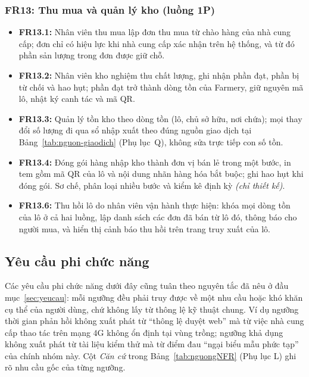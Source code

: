 \subsubsection*{FR13: Thu mua và quản lý kho (luồng 1P)}
\begin{itemize}
    \item \textbf{FR13.1:} Nhân viên thu mua lập đơn thu mua từ chào hàng của
    nhà cung cấp; đơn chỉ có hiệu lực khi nhà cung cấp xác nhận trên hệ thống,
    và từ đó phần sản lượng trong đơn được giữ chỗ.
    \item \textbf{FR13.2:} Nhân viên kho nghiệm thu chất lượng, ghi nhận phần
    đạt, phần bị từ chối và hao hụt; phần đạt trở thành dòng tồn của Farmery,
    giữ nguyên mã lô, nhật ký canh tác và mã QR.
    \item \textbf{FR13.3:} Quản lý tồn kho theo dòng tồn (lô, chủ sở hữu,
    nơi chứa); mọi thay đổi số lượng đi qua sổ nhập xuất theo đúng nguồn giao
    dịch tại Bảng~\ref{tab:nguon-giaodich} (Phụ lục~Q), không sửa trực tiếp con số tồn.
    \item \textbf{FR13.4:} Đóng gói hàng nhập kho thành đơn vị bán lẻ trong
    một bước, in tem gồm mã QR của lô và nội dung nhãn hàng hóa bắt buộc; ghi
    hao hụt khi đóng gói. Sơ chế, phân loại nhiều bước và kiểm kê định kỳ
    \emph{(chỉ thiết kế)}.
    \item \textbf{FR13.6:} Thu hồi lô do nhân viên vận hành thực hiện: khóa
    mọi dòng tồn của lô ở cả hai luồng, lập danh sách các đơn đã bán từ lô
    đó, thông báo cho người mua, và hiển thị cảnh báo thu hồi trên trang truy
    xuất của lô.
\end{itemize}

\subsection{Yêu cầu phi chức năng}
\label{sec:yeucauphichucnang}

Các yêu cầu phi chức năng dưới đây cũng tuân theo nguyên tắc đã nêu ở đầu mục~\ref{sec:yeucau}: mỗi ngưỡng đều phải truy được về một nhu cầu hoặc khó khăn cụ thể của người dùng, chứ không lấy từ thông lệ kỹ thuật chung. Ví dụ ngưỡng thời gian phản hồi không xuất phát từ ``thông lệ duyệt web'' mà từ việc nhà cung cấp thao tác trên mạng 4G không ổn định tại vùng trồng; ngưỡng khả dụng không xuất phát từ tài liệu kiểm thử mà từ điểm đau ``ngại biểu mẫu phức tạp'' của chính nhóm này. Cột \emph{Căn cứ} trong Bảng~\ref{tab:nguongNFR} (Phụ lục L) ghi rõ nhu cầu gốc của từng ngưỡng.

